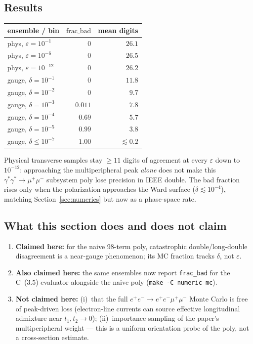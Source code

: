 \documentclass[11pt]{article}
\begin{document}
\subsection{Results}
\label{sec:mc-results}

\begin{center}
\begin{tabular}{@{}lrr@{}}
\toprule
ensemble / bin & $\mathrm{frac\_bad}$ & mean digits \\
\midrule
phys, $\varepsilon=10^{-1}$ & $0$ & $26.1$ \\
phys, $\varepsilon=10^{-6}$ & $0$ & $26.5$ \\
phys, $\varepsilon=10^{-12}$ & $0$ & $26.2$ \\
\midrule
gauge, $\delta=10^{-1}$ & $0$ & $11.8$ \\
gauge, $\delta=10^{-2}$ & $0$ & $9.7$ \\
gauge, $\delta=10^{-3}$ & $0.011$ & $7.8$ \\
gauge, $\delta=10^{-4}$ & $0.69$ & $5.7$ \\
gauge, $\delta=10^{-5}$ & $0.99$ & $3.8$ \\
gauge, $\delta\le10^{-7}$ & $1.00$ & $\lesssim 0.2$ \\
\bottomrule
\end{tabular}
\end{center}

Physical transverse samples stay $\ge 11$ digits of agreement at every
$\varepsilon$ down to $10^{-12}$: approaching the multiperipheral peak
\emph{alone} does not make this $\gamma^*\gamma^*\to\mu^+\mu^-$ subsystem
poly lose precision in IEEE double. The bad fraction rises only when the
polarization approaches the Ward surface ($\delta\lesssim10^{-4}$),
matching Section~\ref{sec:numerics} but now as a phase-space rate.

\subsection{What this section does and does not claim}
\label{sec:mc-claims}

\begin{enumerate}
  \item \textbf{Claimed here:} for the naive 98-term poly, catastrophic
    double/long-double disagreement is a near-gauge phenomenon; its MC
    fraction tracks $\delta$, not $\varepsilon$.
  \item \textbf{Also claimed here:} the same ensembles now report
    \texttt{frac\_bad} for the C~(3.5) evaluator alongside the naive poly
    (\texttt{make -C numeric mc}).
  \item \textbf{Not claimed here:} (i)~that the full $e^+e^-\to e^+e^-\mu^+\mu^-$
    Monte Carlo is free of peak-driven loss (electron-line currents can
    source effective longitudinal admixture near $t_1,t_2\to0$);
    (ii)~importance sampling of the paper's multiperipheral weight ---
    this is a uniform orientation probe of the poly, not a cross-section
    estimate.
\end{enumerate}
\end{document}
